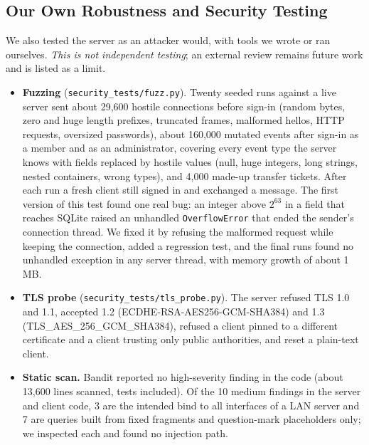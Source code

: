 \documentclass[conference]{IEEEtran}
\newcommand{\code}[1]{\texttt{#1}}
\begin{document}
\subsection{Our Own Robustness and Security Testing}\label{sec:eval-sec}
We also tested the server as an attacker would, with tools we wrote or ran ourselves. \emph{This is not independent testing}; an external review remains future work and is listed as a limit.
\begin{itemize}
  \item \textbf{Fuzzing} (\code{security\_tests/fuzz.py}). Twenty seeded runs against a live server sent about 29{,}600 hostile connections before sign-in (random bytes, zero and huge length prefixes, truncated frames, malformed hellos, HTTP requests, oversized passwords), about 160{,}000 mutated events after sign-in as a member and as an administrator, covering every event type the server knows with fields replaced by hostile values (null, huge integers, long strings, nested containers, wrong types), and 4{,}000 made-up transfer tickets. After each run a fresh client still signed in and exchanged a message. The first version of this test found one real bug: an integer above $2^{63}$ in a field that reaches SQLite raised an unhandled \code{OverflowError} that ended the sender's connection thread. We fixed it by refusing the malformed request while keeping the connection, added a regression test, and the final runs found no unhandled exception in any server thread, with memory growth of about 1 MB.
  \item \textbf{TLS probe} (\code{security\_tests/tls\_probe.py}). The server refused TLS 1.0 and 1.1, accepted 1.2 (ECDHE-RSA-AES256-GCM-SHA384) and 1.3 (TLS\_AES\_256\_GCM\_SHA384), refused a client pinned to a different certificate and a client trusting only public authorities, and reset a plain-text client.
  \item \textbf{Static scan.} Bandit reported no high-severity finding in the code (about 13{,}600 lines scanned, tests included). Of the 10 medium findings in the server and client code, 3 are the intended bind to all interfaces of a LAN server and 7 are queries built from fixed fragments and question-mark placeholders only; we inspected each and found no injection path.
\end{itemize}
\end{document}
